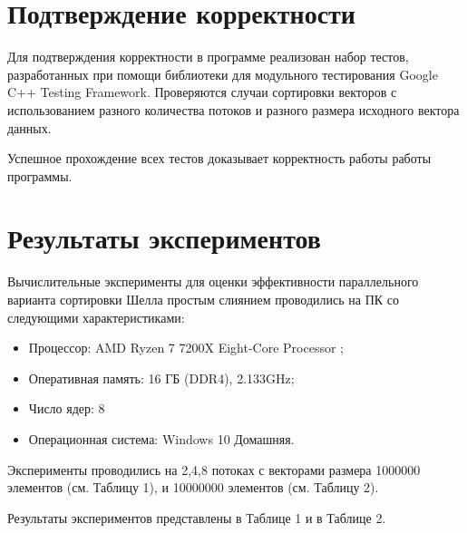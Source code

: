 \documentclass{report}
\begin{document}
\newpage

\section*{Подтверждение корректности}
Для подтверждения корректности в программе реализован набор тестов, разработанных при помощи библиотеки для модульного тестирования Google C++ Testing Framework. Проверяются случаи сортировки векторов с использованием разного количества потоков и разного размера исходного вектора данных.
\par Успешное прохождение всех тестов доказывает корректность работы работы программы.

\newpage

\section*{Результаты экспериментов}
Вычислительные эксперименты для оценки эффективности параллельного варианта
сортировки Шелла простым слиянием проводились на ПК со следующими характеристиками:
\begin{itemize}
\item Процессор: AMD Ryzen 7 7200X Eight-Core Processor ;
\item Оперативная память: 16 ГБ (DDR4), 2.133GHz;
\item Число ядер: 8
\item Операционная система: Windows 10 Домашняя.
\end{itemize}

\par Эксперименты проводились на 2,4,8 потоках с векторами размера 1000000 элементов (см. Таблицу 1), и 10000000 элементов (см. Таблицу 2).

\par Результаты экспериментов представлены в Таблице 1 и в Таблице 2.
\end{document}
